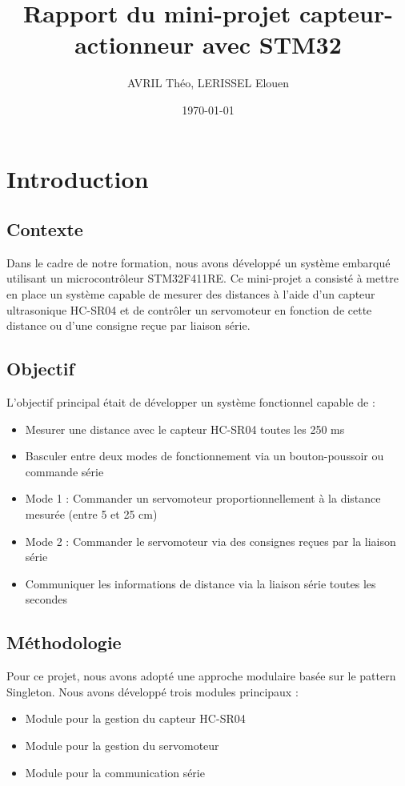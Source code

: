 \documentclass{article}
\title{Rapport du mini-projet capteur-actionneur avec STM32}
\author{AVRIL Théo, LERISSEL Elouen}
\date{\today}
\begin{document}
\maketitle
\tableofcontents

\section{Introduction}
\subsection{Contexte}
Dans le cadre de notre formation, nous avons développé un système embarqué utilisant un microcontrôleur STM32F411RE. Ce mini-projet a consisté à mettre en place un système capable de mesurer des distances à l'aide d'un capteur ultrasonique HC-SR04 et de contrôler un servomoteur en fonction de cette distance ou d'une consigne reçue par liaison série.

\subsection{Objectif}
L'objectif principal était de développer un système fonctionnel capable de :
\begin{itemize}
    \item Mesurer une distance avec le capteur HC-SR04 toutes les 250 ms
    \item Basculer entre deux modes de fonctionnement via un bouton-poussoir ou commande série
    \item Mode 1 : Commander un servomoteur proportionnellement à la distance mesurée (entre 5 et 25 cm)
    \item Mode 2 : Commander le servomoteur via des consignes reçues par la liaison série
    \item Communiquer les informations de distance via la liaison série toutes les secondes
\end{itemize}

\subsection{Méthodologie}
Pour ce projet, nous avons adopté une approche modulaire basée sur le pattern Singleton. Nous avons développé trois modules principaux :
\begin{itemize}
    \item Module pour la gestion du capteur HC-SR04
    \item Module pour la gestion du servomoteur
    \item Module pour la communication série
\end{itemize}
\end{document}
